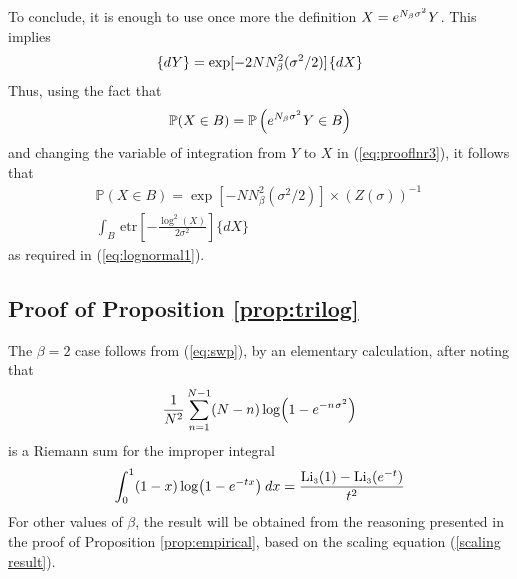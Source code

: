 \documentclass[draftclsnofoot]{IEEEtran}
\begin{document}
To conclude, it is enough to use once more the definition $X = e^{N_\beta\sigma^2}\hspace{0.02cm}Y$. This implies
$$
\lbrace dY \rbrace = \exp[-2NN^2_\beta(\sigma^2/2)]\hspace{0.03cm}\lbrace dX\rbrace
$$
Thus, using the fact that
$$
\mathbb{P}(X \in B) =
\mathbb{P}\left(e^{N_\beta\sigma^2}\hspace{0.02cm}Y \in B\right)
$$
and changing the variable of integration from $Y$ to $X$ in (\ref{eq:prooflnr3}), it follows that
\begin{align}
\nonumber \mathbb{P}(X \in B) =
\exp[-NN^2_\beta(\sigma^2/2)]\times\left(Z(\sigma)\right)^{-1}\,\\ \nonumber \int_B\,\mathrm{etr}\left[-\frac{\log^2(X)}{2\sigma^2}\right] \lbrace dX\rbrace
\end{align}
as required in (\ref{eq:lognormal1}).

\subsection{Proof of Proposition \ref{prop:trilog}}
The $\beta = 2$ case follows from (\ref{eq:swp}), by an elementary calculation, after noting that
$$
    \frac{1}{N^2}\sum^{N-1}_{n=1}(N-n)\log\!\left(1 - e^{-n\hspace{0.02cm}\sigma^2}\right)
$$
is a Riemann sum for the improper integral
$$
\int_0^1(1-x)\log\!\left(1-e^{-tx}\right)\hspace{0.02cm}dx = \frac{\mathrm{Li}_{\scriptscriptstyle 3}(1) -\mathrm{Li}_{\scriptscriptstyle 3}(e^{-t})}{t^2}
$$
For other values of $\beta$, the result will be obtained from the reasoning presented in the proof of Proposition \ref{prop:empirical}, based on the scaling equation (\ref{scaling result}).
\end{document}
